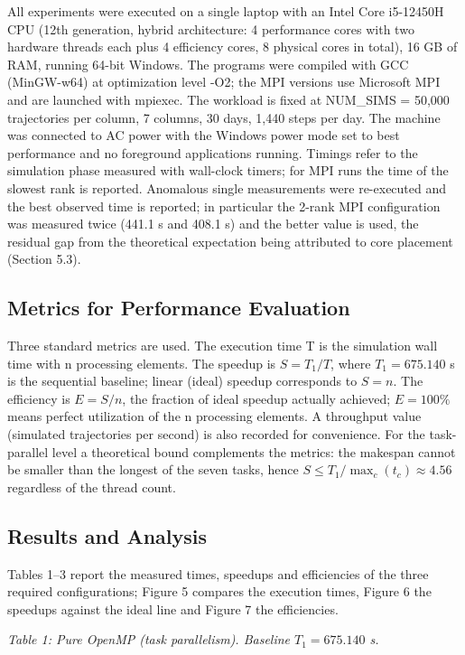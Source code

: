 \documentclass[12pt,a4paper]{article}
\begin{document}
All experiments were executed on a single laptop with an Intel Core
i5-12450H CPU (12th generation, hybrid architecture: 4 performance cores
with two hardware threads each plus 4 efficiency cores, 8 physical cores
in total), 16 GB of RAM, running 64-bit Windows. The programs were
compiled with
GCC (MinGW-w64) at optimization level -O2; the MPI versions use
Microsoft MPI and are launched with mpiexec. The workload is fixed at
NUM\_SIMS = 50,000 trajectories per column, 7 columns, 30 days, 1,440
steps per day. The machine was connected to AC power with the Windows
power mode set to best performance and no foreground applications
running. Timings refer to the simulation phase measured with wall-clock
timers; for MPI runs the time of the slowest rank is reported. Anomalous
single measurements were re-executed and the best observed time is
reported; in particular the 2-rank MPI configuration was measured twice
(441.1 s and 408.1 s) and the better value is used, the residual gap
from the theoretical expectation being attributed to core placement
(Section 5.3).

\subsection{Metrics for Performance Evaluation}

Three standard metrics are used. The execution time T is the simulation
wall time with n processing elements. The speedup is $S = T_1 / T$, where $T_1 =
675.140$ s is the sequential baseline; linear (ideal) speedup corresponds
to $S = n$. The efficiency is $E = S / n$, the fraction of ideal speedup
actually achieved; $E = 100\%$ means perfect utilization of the n
processing elements. A throughput value (simulated trajectories per
second) is also recorded for convenience. For the task-parallel level a
theoretical bound complements the metrics: the makespan cannot be
smaller than the longest of the seven tasks, hence $S \leq T_1 / \max_c(t_c) \approx
4.56$ regardless of the thread count.

\subsection{Results and Analysis}

Tables 1--3 report the measured times, speedups and efficiencies of the
three required configurations; Figure 5 compares the execution times,
Figure 6 the speedups against the ideal line and Figure 7 the
efficiencies.

\emph{Table 1: Pure OpenMP (task parallelism). Baseline $T_1 = 675.140$ s.}
\end{document}
